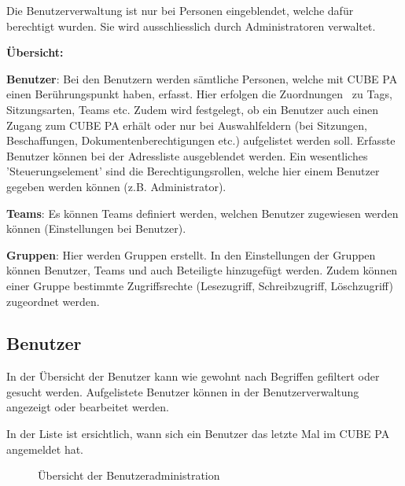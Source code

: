 Die Benutzerverwaltung ist nur bei Personen eingeblendet, welche dafür berechtigt wurden. Sie wird ausschliesslich durch Administratoren verwaltet.

\vspace{4cm}  

\textbf{Übersicht:}

\vspace{\baselineskip}

\textbf{Benutzer}: Bei den Benutzern werden sämtliche Personen, welche mit CUBE PA einen Berührungspunkt haben, erfasst. Hier erfolgen die Zuordnungen \ zu Tags, Sitzungsarten, Teams etc. Zudem wird festgelegt, ob ein Benutzer auch einen Zugang zum CUBE PA erhält oder nur bei Auswahlfeldern (bei Sitzungen, Beschaffungen, Dokumentenberechtigungen etc.) aufgelistet werden soll. Erfasste Benutzer können bei der Adressliste ausgeblendet werden. Ein wesentliches 'Steuerungselement' sind die Berechtigungsrollen, welche hier einem Benutzer gegeben werden können (z.B. Administrator).

\vspace{\baselineskip}

\textbf{Teams}: Es können Teams definiert werden, welchen Benutzer zugewiesen werden können (Einstellungen bei Benutzer).

\vspace{\baselineskip}

\textbf{Gruppen}: Hier werden Gruppen erstellt. In den Einstellungen der Gruppen können Benutzer, Teams und auch Beteiligte hinzugefügt werden. Zudem können einer Gruppe bestimmte Zugriffsrechte (Lesezugriff, Schreibzugriff, Löschzugriff) zugeordnet werden.

\subsection{Benutzer}
\label{bkm:Ref445362390}

In der Übersicht der Benutzer kann wie gewohnt nach Begriffen gefiltert oder gesucht werden. Aufgelistete Benutzer können in der Benutzerverwaltung angezeigt oder bearbeitet werden. 

\vspace{\baselineskip}

In der Liste ist ersichtlich, wann sich ein Benutzer das letzte Mal im CUBE PA angemeldet hat. 

\begin{figure}[H]
\caption{Übersicht der Benutzeradministration}
\end{figure}

